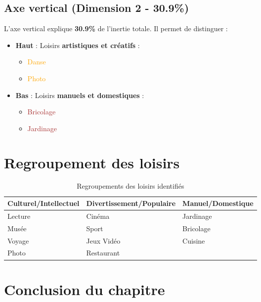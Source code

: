 \documentclass[12pt,a4paper]{book}
\begin{document}
	\subsection{Axe vertical (Dimension 2 - 30.9\%)}
	
	L'axe vertical explique \textbf{30.9\%} de l'inertie totale. Il permet de distinguer :
	
	\begin{itemize}
		\item \textbf{Haut} : Loisirs \textbf{artistiques et créatifs} :
		\begin{itemize}
			\item \textcolor{orange}{Danse}
			\item \textcolor{orange}{Photo}
		\end{itemize}
		
		\item \textbf{Bas} : Loisirs \textbf{manuels et domestiques} :
		\begin{itemize}
			\item \textcolor{brown}{Bricolage}
			\item \textcolor{brown}{Jardinage}
		\end{itemize}
	\end{itemize}
	
	\section{Regroupement des loisirs}
	
	\begin{table}[H]
		\centering
		\caption{Regroupements des loisirs identifiés}
		\begin{tabular}{p{4cm}p{4cm}p{4cm}}
			\toprule
			\textbf{Culturel/Intellectuel} & \textbf{Divertissement/Populaire} & \textbf{Manuel/Domestique} \\
			\midrule
			Lecture & Cinéma & Jardinage \\
			Musée & Sport & Bricolage \\
			Voyage & Jeux Vidéo & Cuisine \\
			Photo & Restaurant & \\
			\bottomrule
		\end{tabular}
	\end{table}
	
	\section{Conclusion du chapitre}
	
\end{document}

